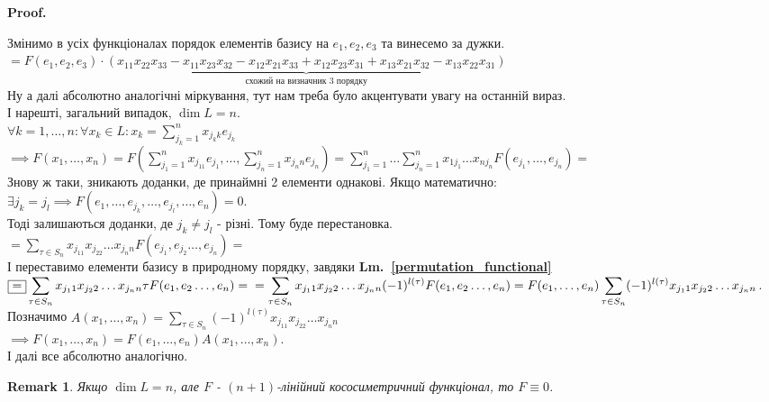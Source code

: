 \documentclass[a4paper, 10pt]{article}
\makeatletter
\theoremstyle{theoremdd}
\newtheorem{remark}[theorem]{Remark}
\newcommand\lmref[1]{\textbf{Lm.~\ref{#1}}}
\renewenvironment{proof}[1][Proof.\\]{\par
\pushQED{\hfill \qed}%
\normalfont \topsep6\p@\@plus6\p@\relax
\trivlist
\item\relax
{\bfseries
#1\@addpunct{.}}\hspace\labelsep\ignorespaces
}{%
\popQED\endtrivlist\@endpefalse
}
\makeatother
\begin{document}
\begin{proof}
Змінимо в усіх функціоналах порядок елементів базису на $e_1,e_2,e_3$ та винесемо за дужки.\\
$\boxed{=} F(e_1,e_2,e_3)\cdot \underbrace{(x_{11}x_{22}x_{33} - x_{11}x_{23}x_{32} - x_{12}x_{21}x_{33} + x_{12}x_{23}x_{31} + x_{13}x_{21}x_{32} - x_{13}x_{22}x_{31})}_{\textrm{схожий на визначник 3 порядку}}$\\
Ну а далі абсолютно аналогічні міркування, тут нам треба було акцентувати увагу на останній вираз.
\bigskip \\
І нарешті, загальний випадок, $\dim L = n$.\\
$\forall k = 1,\dots,n: \forall x_k \in L: x_k = \displaystyle \sum_{j_k=1}^{n} x_{j_kk}e_{j_k}$\\
$\implies F(x_1,\dots,x_n) = \displaystyle F\left(\sum_{j_1=1}^{n} x_{j_11}e_{j_1}, \dots, \sum_{j_n=1}^{n} x_{j_n n}e_{j_n}\right) = \sum_{j_1 = 1}^n \dots \sum_{j_n = 1}^n x_{1j_1}\dots x_{nj_n} F(e_{j_1},\dots,e_{j_n}) \boxed{=}$\\
Знову ж таки, зникають доданки, де принаймні 2 елементи однакові. Якщо математично:\\
$\exists j_k = j_l \implies F(e_1,\dots, e_{j_k}, \dots, e_{j_l}, \dots, e_n) = 0$.\\
Тоді залишаються доданки, де $j_k \neq j_l$ - різні. Тому буде перестановка.\\
$\displaystyle \boxed{=} \sum_{\tau \in S_n} x_{j_11}x_{j_22}\dots x_{j_nn} F(e_{j_1},e_{j_2}\dots, e_{j_n}) \boxed{=}$\\
І переставимо елементи базису в природному порядку, завдяки \lmref{permutation_functional} \\
$\displaystyle \boxed{=} \sum_{\tau \in S_n} x_{j_11}x_{j_22}\dots x_{j_nn} \tau F(e_1,e_2\dots, e_n) = \\
= \displaystyle \sum_{\tau \in S_n} x_{j_11}x_{j_22}\dots x_{j_nn} (-1)^{l(\tau)} F(e_1,e_2\dots, e_n) = \displaystyle F(e_1,\dots,e_n) \sum_{\tau \in S_n} (-1)^{l(\tau)} x_{j_11}x_{j_22}\dots x_{j_nn}$.\\
Позначимо $A(x_1,\dots,x_n) = \displaystyle \sum_{\tau \in S_n} (-1)^{l(\tau)} x_{j_11}x_{j_22}\dots x_{j_nn}$\\
$\implies F(x_1,\dots,x_n) = F(e_1,\dots,e_n)A(x_1,\dots,x_n)$.\\
І далі все абсолютно аналогічно.
\end{proof}

\begin{remark}
Якщо $\dim L = n$, але $F$ - $(n+1)$-лінійний кососиметричний функціонал, то $F \equiv 0$.
\end{remark}
\end{document}
